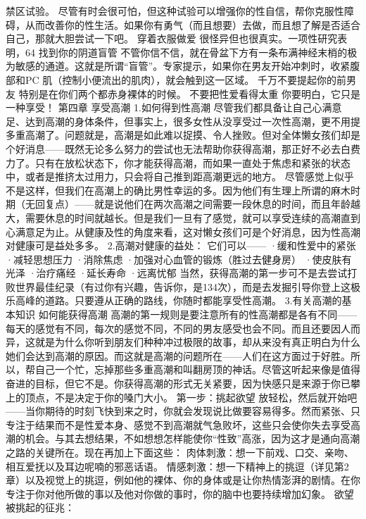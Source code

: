 \documentclass[12pt,UTF8]{ctexbook}
\begin{document}
禁区试验。
尽管有时会很可怕，但这种试验可以增强你的性自信，帮你克服性障碍，从而改善你的性生活。如果你有勇气（而且想要）去做，而且想了解是否适合自己，那就大胆尝试一下吧。
穿着衣服做爱
很怪异但也很真实。一项性研究表明，64%
找到你的阴道盲管
不管你信不信，就在骨盆下方有一条布满神经末梢的极为敏感的通道。这就是所谓“盲管”。专家提示，如果你在男友开始冲刺时，收紧腹部和PC 肌（控制小便流出的肌肉），就会触到这一区域。
千万不要提起你的前男友
特别是在你们两个都赤身裸体的时候。
不要把性爱看得太重
你要明白，它只是一种享受！
第四章 享受高潮
1.如何得到性高潮
尽管我们都具备让自己心满意足、达到高潮的身体条件，但事实上，很多女性从没享受过一次性高潮，更不用提多重高潮了。问题就是，高潮是如此难以捉摸、令人挫败。但对全体懒女孩们却是个好消息——既然无论多么努力的尝试也无法帮助你获得高潮，那正好不必去白费力了。只有在放松状态下，你才能获得高潮，而如果一直处于焦虑和紧张的状态中，或者是推挤太过用力，只会将自己推到距高潮更远的地方。
尽管感觉上似乎不是这样，但我们在高潮上的确比男性幸运的多。因为他们有生理上所谓的麻木时期（无回复点）——就是说他们在两次高潮之间需要一段休息的时间，而且年龄越大，需要休息的时间就越长。但是我们一旦有了感觉，就可以享受连续的高潮直到心满意足为止。从健康及性的角度来看，这对懒女孩们可是个好消息，因为性高潮对健康可是益处多多。
2.高潮对健康的益处：
它们可以——
·缓和性爱中的紧张
·减轻思想压力
·消除焦虑
·加强对心血管的锻炼（胜过去健身房）
·使皮肤有光泽
·治疗痛经
·延长寿命
·远离忧郁
当然，获得高潮的第一步可不是去尝试打败世界最佳纪录（有过你有兴趣，告诉你，是134次），而是去发掘引导你登上这极乐高峰的道路。只要遵从正确的路线，你随时都能享受性高潮。
3.有关高潮的基本知识
如何能获得高潮
高潮的第一规则是要注意所有的性高潮都是各有不同——每天的感觉有不同，每次的感觉不同，不同的男友感受也会不同。而且还要因人而异，这就是为什么你听到朋友们种种冲过极限的故事，却从来没有真正明白为什么她们会达到高潮的原因。而这就是高潮的问题所在——人们在这方面过于好胜。所以，帮自己一个忙，忘掉那些多重高潮和叫翻房顶的神话。尽管这听起来像是值得奋进的目标，但它不是。你获得高潮的形式无关紧要，因为快感只是来源于你已攀上的顶点，不是决定于你的嗓门大小。
第一步：挑起欲望
放轻松，然后就开始吧——当你期待的时刻飞快到来之时，你就会发现说比做要容易得多。然而紧张、只专注于结果而不是性爱本身、感觉不到高潮就气急败坏，这些只会使你失去享受高潮的机会。与其去想结果，不如想想怎样能使你“性致”高涨，因为这才是通向高潮之路的关键所在。现在再加上下面这些：
肉体刺激：想一下前戏、口交、亲吻、相互爱抚以及耳边呢喃的邪恶话语。
情感刺激：想一下精神上的挑逗（详见第2章）以及视觉上的挑逗，例如他的裸体、你的身体或是让你热情澎湃的剧情。在你专注于你对他所做的事以及他对你做的事时，你的脑中也要持续增加幻象。
欲望被挑起的征兆：
\end{document}
